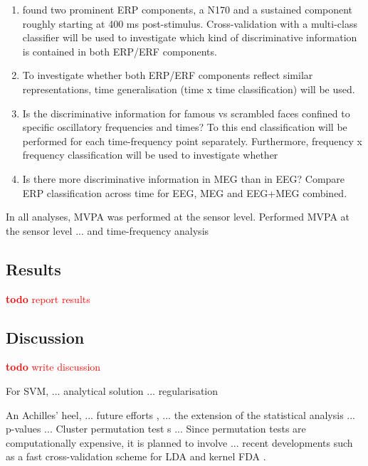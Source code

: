 \documentclass[utf8]{frontiersSCNS} %
\newcommand{\todo}[1]{\textcolor{red}{\textbf{todo} #1}}
\begin{document}
\begin{enumerate}
    \item \cite{Wakeman2015ADataset} found two prominent ERP components, a N170 and a sustained component roughly starting at 400 ms post-stimulus. Cross-validation with a multi-class classifier will be used to investigate which kind of discriminative information is contained in both ERP/ERF components.
    \item To investigate whether both ERP/ERF components reflect similar representations, time generalisation (time x time classification) will be used.
    \item Is the discriminative information for famous vs scrambled faces confined to specific oscillatory frequencies and times? To this end classification will be performed for each time-frequency point separately. Furthermore, frequency x frequency classification will be used to investigate whether 
    \item Is there more discriminative information in MEG than in EEG? Compare ERP classification across time for EEG, MEG and EEG+MEG combined. 
\end{enumerate}

In all analyses, MVPA was performed at the sensor level. Performed MVPA at the sensor level ... and time-frequency analysis


\subsection{Results}

\todo{report results}

\subsection{Discussion}


\todo{write discussion}

For SVM, ... analytical solution ... regularisation \citep{Hastie2004TheMachine}


An Achilles' heel, ... future efforts , ... the extension of the statistical analysis ... p-values ... Cluster permutation test s ... Since permutation tests are computationally expensive, it is planned to involve ... recent developments such as a fast cross-validation scheme for LDA and kernel FDA \citep{Treder2019DirectFDA}.
\end{document}
